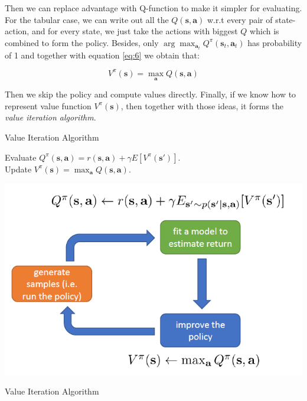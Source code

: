 \documentclass{tufte-handout}
\newcommand{\s}{\mathbf{s}}
\newcommand{\act}{\mathbf{a}}
\begin{document}
Then we can replace advantage with Q-function to make it simpler for evaluating. For the tabular case, we can write out all the $Q(\s, \act)$ w.r.t every pair of state-action, and for every state, we just take the actions with biggest $Q$ which is combined to form the policy. Besides, only $\arg \max_{\act_t} Q^\pi(\s_t, \act_t)$ has probability of 1 and together with equation \ref{eq:6} we obtain that:

\begin{equation}
\label{eq:8}
V^\pi (\s) = \max_\act Q(\s, \act)
\end{equation}

Then we skip the policy and compute values directly. Finally, if we know how to represent value function $V^\pi(\s)$, then together with those ideas, it forms the \emph{value iteration algorithm}.

\begin{algorithm}
  \caption{Value Iteration Algorithm}
    \label{algo:value-iter}
    \begin{algorithmic}[1]
    \STATE Evaluate $Q^\pi (\s, \act) = r(\s, \act) +\gamma E[V^\pi(\s')]$. \\
    \STATE Update $ V^\pi (\s) = \max_\act Q(\s, \act)$. \\
    \ENDWHILE
  \end{algorithmic}
\end{algorithm}

\begin{marginfigure}
\centering
\includegraphics[width=\linewidth]{value-iter}
\caption{Value Iteration Algorithm}
\label{fig:value-iter}
\end{marginfigure}
\end{document}
